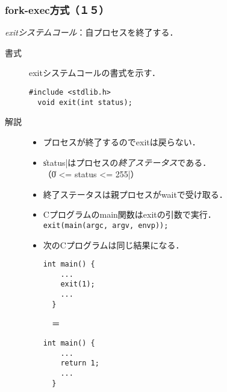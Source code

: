 \documentclass{beamer}                 %
\begin{document}
\begin{frame}[fragile]
  \frametitle{fork-exec方式（１５）}
  \emph{exitシステムコール}：自プロセスを終了する．

  \begin{description}
  \item[書式] exitシステムコールの書式を示す．
\begin{lstlisting}[numbers=none]
  #include <stdlib.h>
  void exit(int status);
\end{lstlisting}

  \item[解説]
    \begin{itemize}
    \item プロセスが終了するのでexitは戻らない．
    \item \|status|はプロセスの\emph{終了ステータス}である．\\
      （\|0 <= status <= 255|）\\
    \item 終了ステータスは親プロセスがwaitで受け取る．
    \item Cプログラムのmain関数はexitの引数で実行．\\
    \vfill
    \texttt{exit(main(argc, argv, envp));}
    \vfill
    \item 次のCプログラムは同じ結果になる．\\
      \begin{minipage}{0.3\columnwidth}
\begin{lstlisting}[numbers=none]
  int main() {
    ...
    exit(1);
    ...
  }
\end{lstlisting}
      \end{minipage} ~~＝~~~
      \begin{minipage}{0.3\columnwidth}
\begin{lstlisting}[numbers=none]
  int main() {
    ...
    return 1;
    ...
  }
\end{lstlisting}
      \end{minipage}
    \end{itemize}
  \end{description}
\end{frame}
\end{document}
